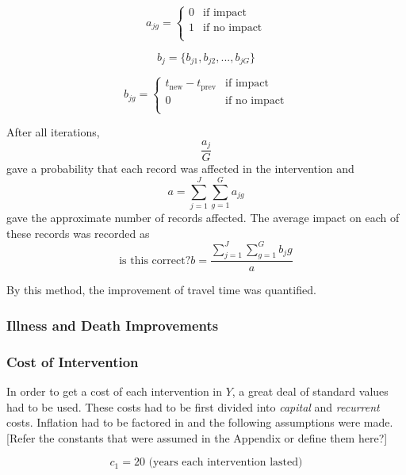 \begin{equation*}
a_{jg} =
\left\{
\begin{array}{ll}
      0 & \text{if impact}\\
      1 & \text{if no impact} \\
\end{array}
\right.
\end{equation*}

\begin{equation*}
b_j = \{b_{j1},b_{j2},...,b_{jG}\}
\end{equation*}

\begin{equation*}
b_{jg} =
\left\{
\begin{array}{ll}
      t_{\text{new}} - t_{\text{prev}} & \text{if impact} \\
      0 & \text{if no impact}\\
\end{array}
\right.
\end{equation*}

After all iterations, 
\begin{equation*}
\frac{a_j}{G}
\end{equation*}
gave a probability that each record was affected in the intervention and
\begin{equation*}
a = \sum_{j=1}^{J} \sum_{g=1}^{G} a_{jg}
\end{equation*}
gave the approximate number of records affected.
The average impact on each of these records was recorded as
\begin{equation*}
\text{is this correct?}
b = \frac{\sum_{j=1}^{J} \sum_{g=1}^{G} b_jg}{a}
\end{equation*}

By this method, the improvement of travel time was quantified.

\subsubsection*{Illness and Death Improvements}


\subsubsection*{Cost of Intervention}
In order to get a cost of each intervention in $Y$, a great deal of standard values had to be used.
These costs had to be first divided into \emph{capital} and \emph{recurrent} costs.
Inflation had to be factored in and the following assumptions were made.
[Refer the constants that were assumed in the Appendix or define them here?]

$$c_1 = 20 \text{ (years each intervention lasted)}$$








